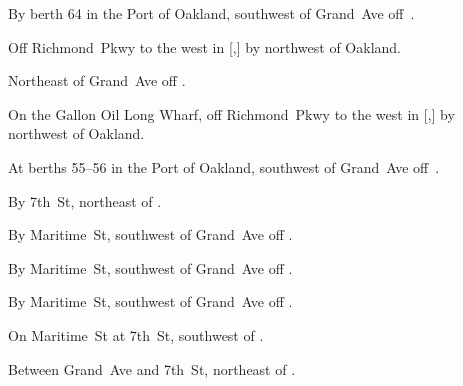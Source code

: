 
\begin{LocationList}

By berth 64 in the Port of Oakland, southwest of Grand~Ave off~.

Off Richmond~Pkwy to the west in [,] by  northwest of Oakland.

Northeast of Grand~Ave off .

On the Gallon Oil Long Wharf, off Richmond~Pkwy to the west in [,] by  northwest of Oakland.

At berths 55--56 in the Port of Oakland, southwest of Grand~Ave off~.

By 7th~St, northeast of .

\Location{\RecruitmentAgency \Recruitment}
By Maritime~St, southwest of Grand~Ave off .

By Maritime~St, southwest of Grand~Ave off .

\Location{\TruckService \Service}
By Maritime~St, southwest of Grand~Ave off .

\Location{\TruckStop \Gas \Rest \Weigh}
On Maritime~St at 7th~St, southwest of .

Between Grand~Ave and 7th~St, northeast of .

\end{LocationList}
